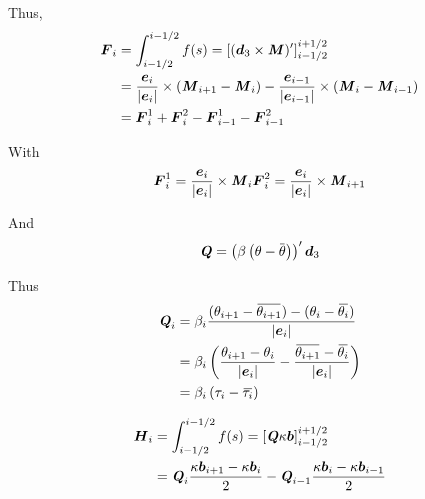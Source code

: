 Thus,
\begin{equation}
	\begin{aligned}
	\boldsymbol{F}_i 
	&= \int_{i-1/2}^{i-1/2} f(s)  = \left[(\boldsymbol{d}_3 \times \boldsymbol{\mathit{M}})'\right]_{i-1/2}^{i+1/2} \\
	&= \frac{\boldsymbol{e}_i}{|\boldsymbol{e}_i|} \times (\boldsymbol{\mathit{M}}_{i+1} - \boldsymbol{\mathit{M}}_{i}) - 
		\frac{\boldsymbol{e}_{i-1}}{|\boldsymbol{e}_{i-1}|} \times (\boldsymbol{\mathit{M}}_{i} - \boldsymbol{\mathit{M}}_{i-1}) \\
	&= \boldsymbol{F}^1_{i} + \boldsymbol{F}^2_{i} - \boldsymbol{F}^1_{i-1} - \boldsymbol{F}^2_{i-1}
	\end{aligned}
\end{equation}

With
\begin{equation}
	\boldsymbol{F}^1_i = \frac{\boldsymbol{e}_i}{|\boldsymbol{e}_i|} \times \boldsymbol{\mathit{M}}_{i} \\
	\boldsymbol{F}^2_i = \frac{\boldsymbol{e}_i}{|\boldsymbol{e}_i|} \times \boldsymbol{\mathit{M}}_{i+1}
\end{equation}

And
\begin{equation}
	\mat{Q} = \left(\beta\left(\theta - \overbar{\theta}\right)\right)' \vect{d}_3
\end{equation}

Thus
\begin{equation}
	\begin{aligned}
	\mat{Q}_i &= \beta_i \frac{(\theta_{i+1} - \overbar{\theta_{i+1}})-(\theta_{i} - \overbar{\theta_{i}})}{|\vect{e}_i|}\\
	&= \beta_i \left(\frac{\theta_{i+1} - \theta_{i}}{|\vect{e}_i|}-\frac{\overbar{\theta_{i+1}} - \overbar{\theta_{i}}}{|\vect{e}_i|}\right) \\
	&= \beta_i \left(\tau_{i} - \overbar{\tau_{i}}\right) \\
	\end{aligned}
\end{equation}

\begin{equation}
	\begin{aligned}
	\boldsymbol{H}_i 
	&= \int_{i-1/2}^{i-1/2} f(s)  = \left[\boldsymbol{\mathit{Q}} \kappa\boldsymbol{b} \right]_{i-1/2}^{i+1/2} \\
	&= \boldsymbol{\mathit{Q}}_i \frac{ \kappa\boldsymbol{b}_{i+1} -  \kappa\boldsymbol{b}_i}{2}
	- \boldsymbol{\mathit{Q}}_{i-1} \frac{ \kappa\boldsymbol{b}_{i} -  \kappa\boldsymbol{b}_{i-1}}{2}
	\end{aligned}
\end{equation}


